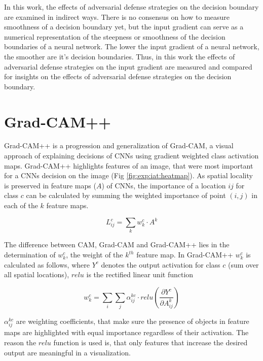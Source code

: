\documentclass[draft,final]{vutinfth} %
\begin{document}
In this work, the effects of adversarial defense strategies on the decision boundary are examined in indirect ways.
There is no consensus on how to measure smoothness of a decision boundary yet, but the input gradient can serve as a numerical representation of the steepness or smoothness of the decision boundaries of a neural network.
The lower the input gradient of a neural network, the smoother are it's decision boundaries.
Thus, in this work the effects of adversarial defense strategies on the input gradient are measured and compared for insights on the effects of adversarial defense strategies on the decision boundary.


\section{Grad-CAM++}

Grad-CAM++ is a progression and generalization of Grad-CAM, a visual approach of explaining decisions of CNNs using gradient weighted class activation maps.
Grad-CAM++ highlights features of an image, that were most important for a CNNs decision on the image (Fig \ref{fig:exp:iat:heatmap}).
As spatial locality is preserved in feature maps ($A$) of CNNs, the importance of a location $i j$ for class $c$ can be calculated by summing the weighted importance of point $(i, j)$ in each of the $k$ feature maps.

\begin{equation}
	L_{ij}^c = \sum_{k} w_k^c \cdot	 A^k
\end{equation}

The difference between CAM, Grad-CAM and Grad-CAM++ lies in the determination of $w_k^c$, the weight of the $k^{th}$ feature map.
In Grad-CAM++ $w_k^c$ is calculated as follows, where $Y^c$ denotes the output activation for class $c$ (sum over all spatial locations), $relu$ is the rectified linear unit function

\begin{equation}
	w_k^c = \sum_i \sum_j \alpha_{ij}^{kc} \cdot relu(\frac{\partial Y^c}{\partial A_{ij}^k})
\end{equation}

$\alpha_{ij}^{kc}$ are weighting coefficients, that make sure the presence of objects in feature maps are highlighted with equal importance regardless of their activation.
The reason the $relu$ function is used is, that only features that increase the desired output are meaningful in a visualization.
\cite{Chattopadhyay2017}
\label{section:grad_cam}
\end{document}
